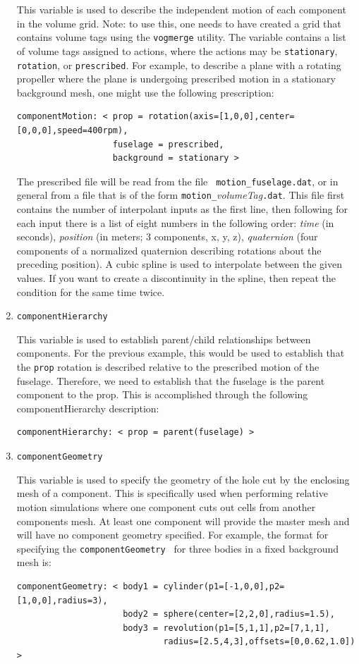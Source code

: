 \documentclass{article}
\begin{document}
\begin{enumerate}
This variable is used to describe the independent motion of each
component in the volume grid.  Note: to use this, one needs to have
created a grid that contains volume tags using the {\tt vogmerge}
utility.  The variable contains a list of volume tags assigned to
actions, where the actions may be {\tt stationary}, {\tt rotation}, or
{\tt prescribed}.  For example, to describe a plane with a rotating
propeller where the plane is undergoing prescribed motion in a
stationary background mesh, one might use the following prescription:
\begin{verbatim}
componentMotion: < prop = rotation(axis=[1,0,0],center=[0,0,0],speed=400rpm),
                   fuselage = prescribed,
                   background = stationary >
\end{verbatim}
The prescribed file will be read from the file {\tt
  motion\_fuselage.dat}, or in general from a file that is of the form
{\tt motion\_}{\it volumeTag}{\tt .dat}.  This file first contains the
number of interpolant inputs as the first line, then following for
each input there is a list of eight numbers in the following order:
{\it time} (in seconds), {\it position} (in meters; 3 components, x,
y, z), {\it quaternion} (four components of a normalized quaternion
describing rotations about the preceding position).  A cubic spline
is used to interpolate between the given values.  If you want to
create a discontinuity in the spline, then repeat the condition
for the same time twice.

\item {\tt componentHierarchy }

  This variable is used to establish parent/child relationships
  between components.  For the previous example, this would be used to
  establish that the {\tt prop} rotation is described relative to the
  prescribed motion of the fuselage.  Therefore, we need to establish
  that the fuselage is the parent component to the prop.  This is
  accomplished through the following componentHierarchy description:
\begin{verbatim}
componentHierarchy: < prop = parent(fuselage) >
\end{verbatim}

\item {\tt componentGeometry }

  This variable is used to specify the geometry of the hole cut by the
  enclosing mesh of a component.  This is specifically used when
  performing relative motion simulations where one component cuts out
  cells from another components mesh.  At least one component will
  provide the master mesh and will have no component geometry
  specified.  For example, the format for specifying the {\tt componentGeometry }
  for three bodies in a fixed background mesh is:
\begin{verbatim}
componentGeometry: < body1 = cylinder(p1=[-1,0,0],p2=[1,0,0],radius=3),
                     body2 = sphere(center=[2,2,0],radius=1.5),
                     body3 = revolution(p1=[5,1,1],p2=[7,1,1],
                             radius=[2.5,4,3],offsets=[0,0.62,1.0]) >
\end{verbatim}
  

\end{enumerate}
\end{document}
